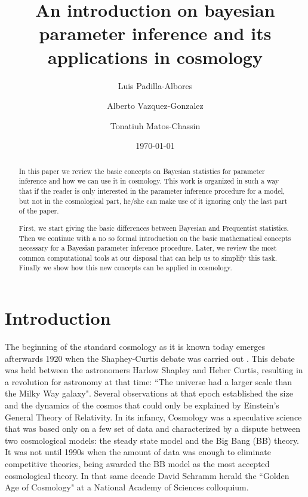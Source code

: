 \documentclass[onecolumn,           %
               showpacs,            %
               preprintnumbers,     %
               aps,                 %
               prl,          	    %
               letterpaper,             %
               superscriptaddress,      %
               nofootinbib,         %
               tightenlines,        %
               floats,floatfix      %
               ,usenatbib,
               ]{revtex4-1}
\begin{document}
\title{An introduction on bayesian parameter inference and its applications in cosmology}
\author{Luis Padilla-Albores}  
   \author{Alberto Vazquez-Gonzalez}  
  \author{Tonatiuh Matos-Chassin}  
\date{\today}

\begin{abstract}

In this paper we review the basic concepts on Bayesian statistics for parameter inference and how we can use it in cosmology. This work is organized in such a way that if the reader is only interested in the parameter inference procedure for a model, but not in the cosmological part, he/she can make use of it ignoring only the last part of the paper. 

First, we start giving the basic differences between Bayesian and Frequentist statistics. Then we continue with a no so formal introduction on the basic mathematical concepts necessary for a Bayesian parameter inference procedure. Later, we review the most common computational tools at our disposal that can help us to simplify this task. Finally we show how this new concepts can be applied in cosmology.     
\end{abstract}

\maketitle

\section{Introduction}

The beginning of the standard cosmology as it is known today emerges afterwards 1920 when the Shaphey-Curtis debate was carried out \cite{debate}. This debate was held between the astronomers Harlow Shapley and Heber Curtis, resulting in a revolution for astronomy at that time: ``The universe had a larger scale than the Milky Way galaxy". Several observations at that epoch established the size and the dynamics of the cosmos that could only be explained by Einstein's General Theory of Relativity. In its infancy, Cosmology was a speculative science that was based only on a few set of data and characterized by a dispute between two cosmological models: the steady state model and the Big Bang (BB) theory. It was not until 1990s when the amount of data was enough to eliminate competitive theories, being awarded the BB model as the most accepted cosmological theory. In that same decade David Schramm herald the ``Golden Age of Cosmology" at a National Academy of Sciences colloquium.    
\end{document}
